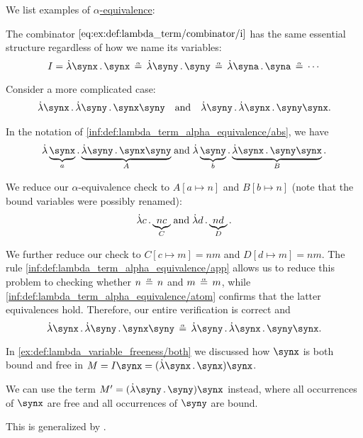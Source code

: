 \begin{example}\label{ex:def:lambda_term_alpha_equivalence}
  We list examples of \hyperref[def:lambda_term_alpha_equivalence]{\( \alpha \)-equivalence}:
  \begin{thmenum}
     The combinator \( \ref{eq:ex:def:lambda_term/combinator/i} \) has the same essential structure regardless of how we name its variables:
    \begin{equation*}
      I = \qabs \synx \synx \aequiv \qabs \syny \syny \aequiv \qabs \syna \syna \aequiv \cdots
    \end{equation*}

     Consider a more complicated case:
    \begin{align*}
      \qabs \synx \qabs \syny \synx \syny
      &&
      \T{and}
      &&
      \qabs \syny \qabs \synx \syny \synx.
    \end{align*}

    In the notation of \ref{inf:def:lambda_term_alpha_equivalence/abs}, we have
    \begin{equation*}
      \qabs {\underbrace{\synx}_a} \underbrace{\qabs \syny \synx \syny}_A
      \T{and}
      \qabs {\underbrace{\syny}_b} \underbrace{\qabs \synx \syny \synx}_B.
    \end{equation*}

    We reduce our \( \alpha \)-equivalence check to \( A[a \mapsto n] \) and \( B[b \mapsto n] \) (note that the bound variables were possibly renamed):
    \begin{equation*}
      \qabs c \underbrace{n c}_C
      \T{and}
      \qabs d \underbrace{n d}_D.
    \end{equation*}

    We further reduce our check to \( C[c \mapsto m] = nm \) and \( D[d \mapsto m] = nm \). The rule \ref{inf:def:lambda_term_alpha_equivalence/app} allows us to reduce this problem to checking whether \( n \aequiv n \) and \( m \aequiv m \), while \ref{inf:def:lambda_term_alpha_equivalence/atom} confirms that the latter equivalences hold. Therefore, our entire verification is correct and
    \begin{equation*}
      \qabs \synx \qabs \syny \synx \syny \aequiv \qabs \syny \qabs \synx \syny \synx.
    \end{equation*}

     In \cref{ex:def:lambda_variable_freeness/both} we discussed how \( \synx \) is both bound and free in \( M = I \synx = (\qabs \synx \synx) \synx \).

    We can use the term \( M' = (\qabs \syny \syny) \synx \) instead, where all occurrences of \( \synx \) are free and all occurrences of \( \syny \) are bound.

    This is generalized by .
  \end{thmenum}
\end{example}


